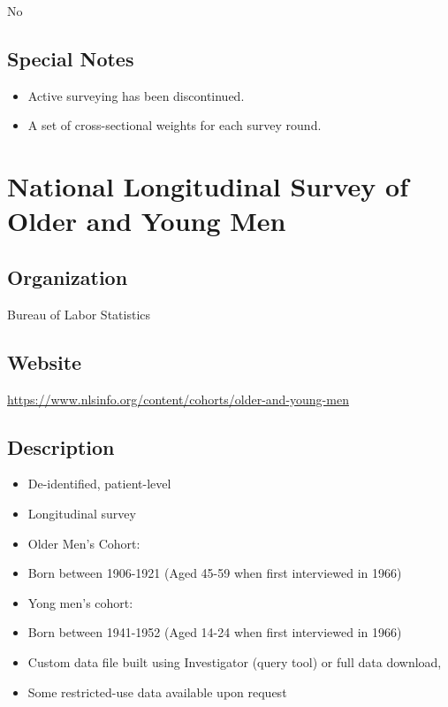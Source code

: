 \documentclass[
]{book}
\providecommand{\tightlist}{%
  \setlength{\itemsep}{0pt}\setlength{\parskip}{0pt}}
\begin{document}
No

\hypertarget{special-notes-55}{%
\section{Special Notes}\label{special-notes-55}}

\begin{itemize}
\tightlist
\item
  Active surveying has been discontinued.
\item
  A set of cross-sectional weights for each survey round.
\end{itemize}

\mainmatter

\hypertarget{national-longitudinal-survey-of-older-and-young-men}{%
\chapter{National Longitudinal Survey of Older and Young Men}\label{national-longitudinal-survey-of-older-and-young-men}}

\hypertarget{organization-56}{%
\section{Organization}\label{organization-56}}

Bureau of Labor Statistics

\hypertarget{website-56}{%
\section{Website}\label{website-56}}

\url{https://www.nlsinfo.org/content/cohorts/older-and-young-men}

\hypertarget{description-56}{%
\section{Description}\label{description-56}}

\begin{itemize}
\tightlist
\item
  De-identified, patient-level
\item
  Longitudinal survey
\item
  Older Men's Cohort:
\item
  Born between 1906-1921 (Aged 45-59 when first interviewed in 1966)
\item
  Yong men's cohort:
\item
  Born between 1941-1952 (Aged 14-24 when first interviewed in 1966)
\item
  Custom data file built using Investigator (query tool) or full data download,
\item
  Some restricted-use data available upon request
\end{itemize}
\end{document}
